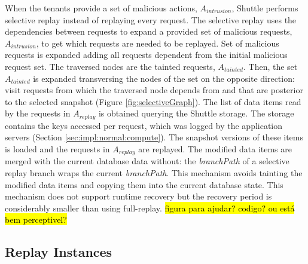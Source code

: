 When the tenants provide a set of malicious actions, $A_{intrusion}$, Shuttle performs selective replay instead of replaying every request. The selective replay uses the dependencies between requests to expand a provided set of malicious requests, $A_{intrusion}$,  to get which requests are needed to be replayed. Set of malicious requests is expanded adding all requests dependent from the initial malicious request set. The traversed nodes are the tainted requests, $A_{tainted}$. Then, the set $A_{tainted}$ is expanded transversing the nodes of the set on the opposite direction: visit requests from which the traversed node depends from and that are posterior to the selected snapshot (Figure \ref{fig:selectiveGraph}). The list of data items read by the requests in $A_{replay}$ is obtained querying the Shuttle storage. The storage contains the keys accessed per request, which was logged by the application servers (Section \ref{sec:impl:normal:compute}). The snapshot versions of these items is loaded and the requests in $A_{replay}$ are replayed. The modified data items are merged with the current database data without: the \emph{branchPath} of a selective replay branch wraps the current \emph{branchPath}. This mechanism avoids tainting the modified data items and copying them into the current database state. This mechanism does not support runtime recovery but the recovery period is considerably smaller than using full-replay. \hl{figura para ajudar? codigo? ou está bem perceptivel?} \\



\subsection{Replay Instances}\label{sec:impl:recovery:replay}

